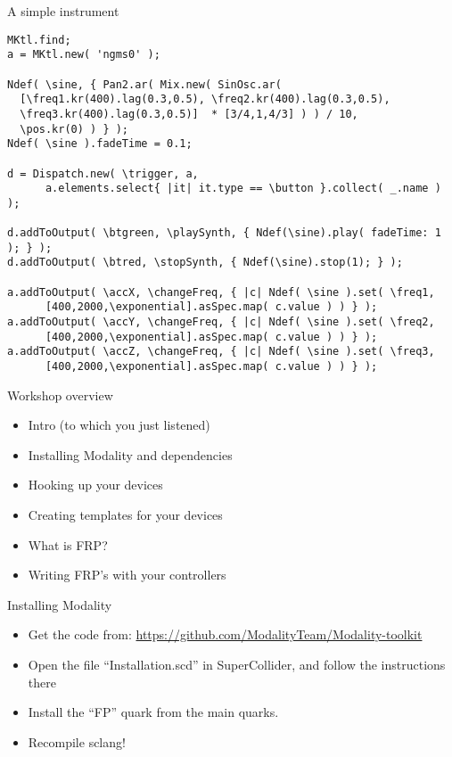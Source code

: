 \documentclass[pdf,slideColor,colorBG,accumulate,total]{prosper}
\begin{document}
\begin{slide}{A simple instrument}
 
 \scriptsize
 \begin{verbatim}
MKtl.find;
a = MKtl.new( 'ngms0' );

Ndef( \sine, { Pan2.ar( Mix.new( SinOsc.ar( 
  [\freq1.kr(400).lag(0.3,0.5), \freq2.kr(400).lag(0.3,0.5), 
  \freq3.kr(400).lag(0.3,0.5)]  * [3/4,1,4/3] ) ) / 10,
  \pos.kr(0) ) } );
Ndef( \sine ).fadeTime = 0.1;

d = Dispatch.new( \trigger, a, 
      a.elements.select{ |it| it.type == \button }.collect( _.name ) );

d.addToOutput( \btgreen, \playSynth, { Ndef(\sine).play( fadeTime: 1 ); } );
d.addToOutput( \btred, \stopSynth, { Ndef(\sine).stop(1); } );

a.addToOutput( \accX, \changeFreq, { |c| Ndef( \sine ).set( \freq1, 
      [400,2000,\exponential].asSpec.map( c.value ) ) } );
a.addToOutput( \accY, \changeFreq, { |c| Ndef( \sine ).set( \freq2, 
      [400,2000,\exponential].asSpec.map( c.value ) ) } );
a.addToOutput( \accZ, \changeFreq, { |c| Ndef( \sine ).set( \freq3, 
      [400,2000,\exponential].asSpec.map( c.value ) ) } );
 \end{verbatim}

\end{slide}

 


\begin{slide}{Workshop overview}
 
 \begin{itemize}
  \item Intro (to which you just listened)
  \item Installing Modality and dependencies
  \item Hooking up your devices
  \item Creating templates for your devices
  \item What is FRP?
  \item Writing FRP's with your controllers
 \end{itemize}
\end{slide}

\begin{slide}{Installing Modality}

\begin{itemize}
 \item Get the code from: \url{https://github.com/ModalityTeam/Modality-toolkit}
 \item Open the file ``Installation.scd'' in SuperCollider, and follow the instructions there
 \item Install the ``FP'' quark from the main quarks.
 \item Recompile sclang!
\end{itemize}
 
\end{slide}
\end{document}
